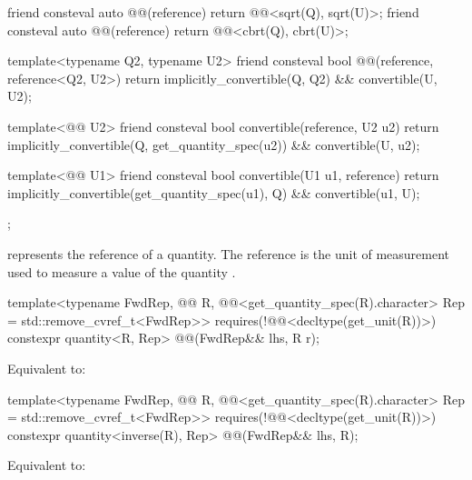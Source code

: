 \begin{codeblock}
{{  friend consteval auto @@(reference) { return @@<sqrt(Q{}), sqrt(U{})>{}; }
  friend consteval auto @@(reference) { return @@<cbrt(Q{}), cbrt(U{})>{}; }

  template<typename Q2, typename U2>
  friend consteval bool @@(reference, reference<Q2, U2>)
  {
    return implicitly_convertible(Q{}, Q2{}) && convertible(U{}, U2{});
  }

  template<@@ U2>
  friend consteval bool convertible(reference, U2 u2)
  {
    return implicitly_convertible(Q{}, get_quantity_spec(u2)) && convertible(U{}, u2);
  }

  template<@@ U1>
  friend consteval bool convertible(U1 u1, reference)
  {
    return implicitly_convertible(get_quantity_spec(u1), Q{}) && convertible(u1, U{});
  }
};

}
\end{codeblock}

\pnum
{} represents the reference of a quantity.
The reference is the unit of measurement 
used to measure a value of the quantity .

\begin{itemdecl}
template<typename FwdRep, @@ R,
         @@<get_quantity_spec(R{}).character> Rep = std::remove_cvref_t<FwdRep>>
  requires(!@@<decltype(get_unit(R{}))>)
constexpr quantity<R{}, Rep> @@(FwdRep&& lhs, R r);
\end{itemdecl}

\begin{itemdescr}
\pnum
\effects
Equivalent to:
\end{itemdescr}

\begin{itemdecl}
template<typename FwdRep, @@ R,
         @@<get_quantity_spec(R{}).character> Rep = std::remove_cvref_t<FwdRep>>
  requires(!@@<decltype(get_unit(R{}))>)
constexpr quantity<inverse(R{}), Rep> @@(FwdRep&& lhs, R);
\end{itemdecl}

\begin{itemdescr}
\pnum
\effects
Equivalent to:
\end{itemdescr}

